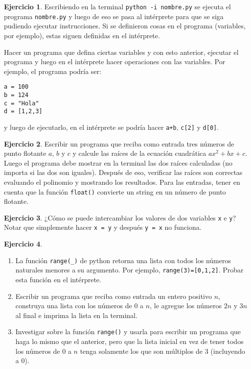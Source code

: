 \documentclass[a4paper,12pt]{book}
\theoremstyle{definition}
\newtheorem{ejercicio}{Ejercicio}
\begin{document}
	\begin{ejercicio}\label{ejer-pythonInteractive}
		Escribiendo en la terminal {\tt python -i nombre.py} se ejecuta el programa {\tt nombre.py} y luego de eso se pasa al intérprete para que se siga pudiendo ejecutar instrucciones. Si se definieron cosas en el programa (variables, por ejemplo), estas siguen definidas en el intérprete.
		
		Hacer un programa que defina ciertas variables y con esto anterior, ejecutar el programa y luego en el intérprete hacer operaciones con las variables.
		Por ejemplo, el programa podría ser:
		\begin{verbatim}
a = 100
b = 124
c = "Hola"
d = [1,2,3]
		\end{verbatim}
		y luego de ejecutarlo, en el intérprete se podría hacer {\tt a+b}, {\tt c[2]} y {\tt d[0]}.
	\end{ejercicio}

	\begin{ejercicio}\label{ejer-polSegGrado}
		Escribir un programa que reciba como entrada tres números de punto flotante $a$, $b$ y $c$ y calcule las raíces de la ecuación cuadrática $ax^2+bx+c$. Luego el programa debe mostrar en la terminal las dos raíces calculadas (no importa si las dos son iguales). Después de eso, verificar las raíces son correctas evaluando el polinomio y mostrando los resultados. Para las entradas, tener en cuenta que la función {\tt float()} convierte un string en un número de punto flotante.
	\end{ejercicio}
	
	\begin{ejercicio}
		¿Cómo se puede intercambiar los valores de dos variables {\tt x} e {\tt y}? Notar que simplemente hacer {\tt x = y} y después {\tt y = x} no funciona.
	\end{ejercicio}
	
	\begin{ejercicio}
		\begin{enumerate}
			\item La función {\tt range(\_)} de python retorna una lista con todos los números naturales menores a su argumento. Por ejemplo, {\tt range(3)=[0,1,2]}. Probar esta función en el intérprete.
			\item Escribir un programa que reciba como entrada un entero positivo $n$, construya una lista con los números de $0$ a $n$, le agregue los números $2n$ y $3n$ al final e imprima la lista en la terminal.
			\item Investigar sobre la función {\tt range()} y usarla para escribir un programa que haga lo mismo que el anterior, pero que la lista inicial en vez de tener todos los números de $0$ a $n$ tenga solamente los que son múltiplos de $3$ (incluyendo a $0$).
		\end{enumerate}
	\end{ejercicio}
	
\end{document}
